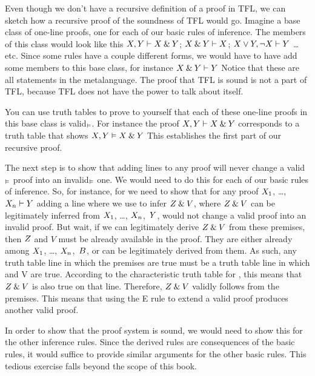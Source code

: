 Even though we don't have a recursive definition of a proof in TFL, we can sketch how a recursive proof of the soundness of TFL would go. Imagine a base class of one-line proofs, one for each of our 
basic
rules of inference. The members of this class would look like this $X, Y \vdash  X \mathbin{\&} Y$; $X \mathbin{\&} Y \vdash X$; $X \vee Y, \neg X \vdash  Y$ \ldots{} etc. Since some rules have a couple different forms, we would have to have add some members to this base class, for instance $X \mathbin{\&} Y \vdash  Y$ Notice that these are all statements in the metalanguage. The proof that TFL is sound is not a part of TFL, because TFL does not have the power to talk about itself. 

You can use truth tables to prove to yourself that each of these one-line proofs in this base class is valid$_{\vDash}$. For instance the proof $X, Y \vdash X \mathbin{\&} Y$ corresponds to a truth table that shows $X, Y \vDash  X \mathbin{\&} Y$ This establishes the first part of our recursive proof. 

The next step is to show that adding lines to any proof will never change a valid$_{\vDash}$ proof into an invalid$_{\vDash}$ one. We would need to do this for each of our 
basic rules of inference. So, for instance, for  we need to show that for any proof $X_{1}$, \dots, $X_{n} \vdash  Y$ adding a line where we use  to infer $Z \mathbin{\&} V$, where $Z \mathbin{\&} V$ can be legitimately inferred from $X_{1}$, \dots, $X_{n}$,~$Y$, would not change a valid proof into an invalid proof. But wait, if we can legitimately derive $Z \mathbin{\&} V$ from these premises, then $Z$ and $V$ must be already available in the proof. They are either already among $X_{1}$, \dots, $X_{n}$,~$B$, or can be legitimately derived from them. As such, any truth table line in which the premises are true must be a truth table line in which \metaZ and V are true. According to the characteristic truth table for \eand, this means that $Z \mathbin{\&} V$ is also true on that line. Therefore, $Z \mathbin{\&} V$ validly follows from the premises. This means that using the {\eand}E rule to extend a valid proof produces another valid proof.

In order to show that the proof system is sound, we would need to show this for the other inference rules. Since the derived rules are consequences of the basic rules, it would suffice to provide similar arguments for the 
other basic rules. This tedious exercise falls beyond the scope of this book.

